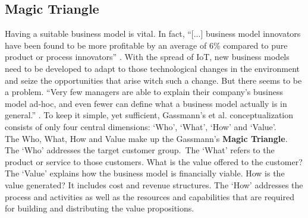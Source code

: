 	\subsection{Magic Triangle}
	\label{sec:mt}
	\vspace{-1em}
		Having a suitable business model is vital. In fact, ``[...] business model innovators have been found to be more profitable by an average of 6\% compared to pure product or process innovators'' \cite{gassmann55}. With the spread of IoT, new business models need to be developed to adapt to those technological changes in the environment and seize the opportunities that arise witch such a change. But there seems to be a problem. ``Very few managers are able to explain their company's business model ad-hoc, and even fewer can define what a business model actually is in general.'' \cite{gassmann55}. To keep it simple, yet sufficient, Gassmann's et al. conceptualization consists of only four central dimensions: `Who', `What', `How' and `Value'. \\
		The Who, What, How and Value make up the Gassmann's \textbf{Magic Triangle}. The `Who' addresses the target customer group.~The `What' refers to the product or service to those customers. What is the value offered to the customer? The `Value' explains how the business model is financially viable. How is the value generated? It includes cost and revenue structures. The `How' addresses the process and activities as well as the resources and capabilities that are required for building and distributing the value propositions.

